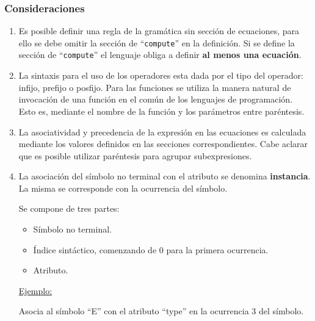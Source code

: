 \subsubsection*{Consideraciones}
\label{subsec:consirule}
\begin{enumerate}
\item Es posible definir una regla de la gramática sin sección de ecuaciones, para ello se debe omitir la sección de ``\texttt{compute}'' en la definición. Si se define la sección de ``\texttt{compute}'' el lenguaje obliga a definir \textbf{al menos una ecuación}.

\item La sintaxis para el uso de los operadores esta dada por el tipo del operador: infijo, prefijo o posfijo. Para las funciones se utiliza la manera natural de invocación de una función en el común de los lenguajes de programación. Esto es, mediante el nombre de la función y los parámetros entre paréntesis.

\item La asociatividad y precedencia de la expresión en las ecuaciones es calculada mediante los valores definidos en las secciones correspondientes. Cabe aclarar que es posible utilizar paréntesis para agrupar subexpresiones.

\item La asociación del símbolo no terminal con el atributo se denomina \textbf{instancia}. La misma se corresponde con la ocurrencia del símbolo. 

Se compone de tres partes:
\begin{itemize}
\item Símbolo no terminal.
\item Índice sintáctico, comenzando de 0 para la primera ocurrencia.
\item Atributo.
\end{itemize}
\begin{center} \underline{Ejemplo:}\  
\end{center} 

Asocia al símbolo ``E'' con el atributo ``type'' en la ocurrencia 3 del símbolo.

\end{enumerate}

